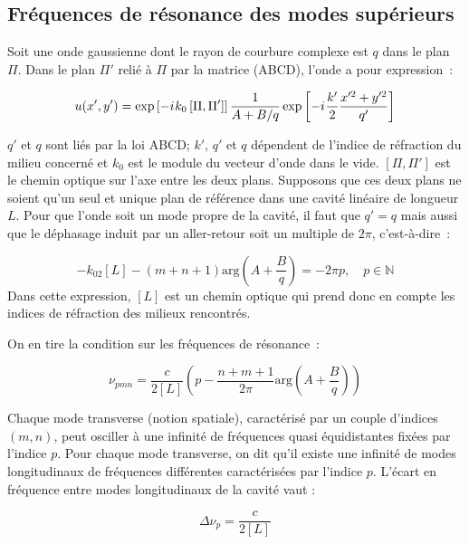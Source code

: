 \documentclass[a4paper]{book}
\newcommand{\iu}{{i\mkern1mu}}
\begin{document}
\subsection{Fréquences de résonance des modes supérieurs}

Soit une onde gaussienne dont le rayon de courbure complexe est $q$ dans le plan $\Pi$.
Dans le plan $\Pi'$ relié à $\Pi$ par la matrice (ABCD), l'onde a pour expression~:

\begin{equation}
    u(x',y')=\exp\left[-\iu k_0 \left[\Pi, \Pi'\right]\right]\frac{1}{A+B/q}\exp\left[-\iu \frac{k'}{2}\frac{x'^2+y'^2}{q'}\right]
\end{equation}

$q'$ et $q$ sont liés par la loi ABCD; $k'$, $q'$ et $q$ dépendent de l'indice de réfraction du milieu concerné et $k_0$ est le module du vecteur d'onde dans le vide. $[\Pi, \Pi']$ est le chemin optique sur l'axe entre les deux plans.
Supposons que ces deux plans ne soient qu'un seul et unique plan de référence dans une cavité linéaire de longueur $L$. Pour que l'onde soit un mode propre de la cavité, il faut que $q'=q$ mais aussi que le déphasage induit par un aller-retour soit un multiple de $2\pi$, c'est-à-dire~:

\begin{equation}
    -k_02[L]-(m+n+1)\mathrm{arg}\left(A+\frac{B}{q}\right)=-2\pi p, \quad p\in \mathbb{N}
\end{equation}
Dans cette expression, $[L]$ est un chemin optique qui prend donc en compte les indices de réfraction des milieux rencontrés.

On en tire la condition sur les fréquences de résonance~:

\begin{equation}
    \nu_{pmn}=\frac{c}{2[L]}\left(p-\frac{n+m+1}{2\pi}\mathrm{arg}\left(A+\frac{B}{q}\right)\right)
\end{equation}

Chaque mode transverse (notion spatiale), caractérisé par un couple d'indices $(m,n)$, peut osciller à une infinité de fréquences quasi équidistantes fixées par l'indice $p$. Pour chaque mode transverse, on dit qu'il existe une infinité de modes longitudinaux de fréquences différentes caractérisées par l'indice $p$. L'écart en fréquence entre modes longitudinaux de la cavité vaut :

\begin{equation}
    \Delta\nu_p=\frac{c}{2[L]}
\end{equation}
\end{document}
